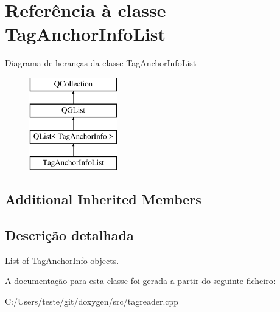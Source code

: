 \hypertarget{class_tag_anchor_info_list}{\section{Referência à classe Tag\-Anchor\-Info\-List}
\label{class_tag_anchor_info_list}
}
Diagrama de heranças da classe Tag\-Anchor\-Info\-List\begin{figure}[H]
\begin{center}
\leavevmode
\includegraphics[height=4.000000cm]{class_tag_anchor_info_list}
\end{center}
\end{figure}
\subsection*{Additional Inherited Members}


\subsection{Descrição detalhada}
List of \hyperlink{class_tag_anchor_info}{Tag\-Anchor\-Info} objects. 

A documentação para esta classe foi gerada a partir do seguinte ficheiro\-:\begin{DoxyCompactItemize}
\item 
C\-:/\-Users/teste/git/doxygen/src/tagreader.\-cpp\end{DoxyCompactItemize}
